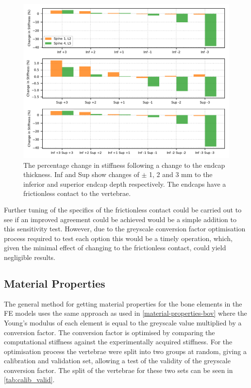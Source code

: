 \begin{figure}[h!]
\centering
\includegraphics[width=\textwidth]{Chapters/Chapter_HT_images/without.pdf}
\caption{The percentage change in stiffness following a change to the endcap
thickness. Inf and Sup show changes of $\pm$ 1, 2 and 3 mm to the inferior and
superior endcap depth respectively. The endcaps have a frictionless contact to
the vertebrae.}
\label{fig:without}
\end{figure}

Further tuning of the specifics of the frictionless contact could be carried
out to see if an improved agreement could be achieved would be a simple
addition to this sensitivity test.
However, due to the greyscale conversion factor optimisation process required
to test each option this would be a timely operation, which, given the minimal
effect of changing to the frictionless contact, could yield negligible
results.




\subsection{Material Properties}

The general method for getting material properties for the bone elements in the
FE models uses the same approach as used in \cref{material-properties-bov}
where the Young's modulus of each element is equal to the greyscale value
multiplied by a conversion factor.
The conversion factor is optimised by comparing the computational stiffness
against the experimentally acquired stiffness.
For the optimisation process the vertebrae were split into two groups at
random, giving a calibration and validation set, allowing a test of the
validity of the greyscale conversion factor.
The split of the vertebrae for these two sets can be seen in
\cref{tab:calib_valid}.

